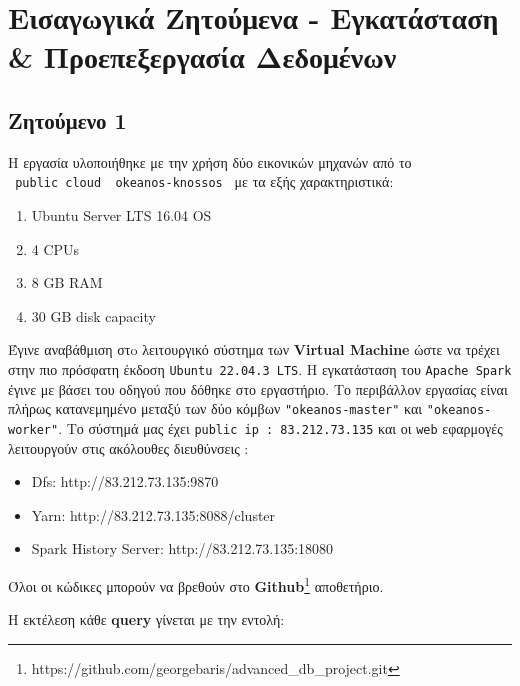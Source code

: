 \documentclass{article}
\begin{document}
\section*{Εισαγωγικά Ζητούμενα - Εγκατάσταση \& Προεπεξεργασία Δεδομένων}
\label{sec:introductory_z}
\subsection*{Ζητούμενο 1}
\label{subsec:Z1}
Η εργασία υλοποιήθηκε με την χρήση δύο εικονικών μηχανών από το\\ \texttt{ public cloud ~okeanos-knossos }  με τα εξής χαρακτηριστικά:
\begin{enumerate}
    \item   Ubuntu Server LTS 16.04 OS
    \item   4 CPUs
    \item   8 GB RAM
    \item   30 GB disk capacity
\end{enumerate}
Έγινε αναβάθμιση στo λειτουργικό σύστημα των \textbf{Virtual Machine} ώστε να τρέχει στην πιο πρόσφατη έκδοση \texttt{Ubuntu 22.04.3 LTS}. Η εγκατάσταση του \texttt{Apache Spark} έγινε με βάσει του οδηγού που δόθηκε στο εργαστήριο. Το περιβάλλον εργασίας είναι πλήρως κατανεμημένο μεταξύ των δύο κόμβων \texttt{"okeanos-master"} και \texttt{"okeanos-worker"}. Το σύστημά μας έχει \texttt{public ip : 83.212.73.135} και οι \texttt{web} εφαρμογές λειτουργούν στις ακόλουθες διευθύνσεις :
\begin{itemize}
    \item   Dfs: http://83.212.73.135:9870
    \item   Yarn: http://83.212.73.135:8088/cluster 
    \item   Spark History Server: http://83.212.73.135:18080

\end{itemize}
Όλοι οι κώδικες μπορούν να βρεθούν στο \textbf{ Github}\footnote{ https://github.com/georgebaris/advanced\_db\_project.git} αποθετήριο. 


Η εκτέλεση κάθε \textbf{query} γίνεται με την εντολή:
\end{document}

